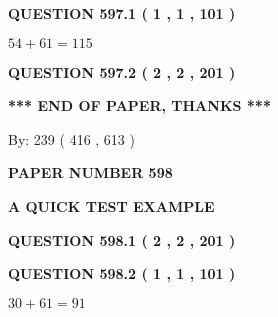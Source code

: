 \documentclass[12pt]{article}
\begin{document}
   
  
\vspace{0.2in}
  
{\textbf{\Large{QUESTION
597.1 
 ( 1 , 1 , 101 )
}}}
  
  
 
 

$ %
54 +  %
61=   %
115$
 
 
  
\vspace{0.2in}
  
{\textbf{\Large{QUESTION
597.2 
 ( 2 , 2 , 201 )
}}}
  
  
   
   
 \vspace{0.2in}
 
   
   
   
   
\vspace{1.0in} 
{\textbf{\large{ *** END OF PAPER, THANKS *** }}} 
   
   
\hspace{1.0in} By: 
 239 ( 416 ,  613 )
   
   
   
   
\newpage 
\setcounter{page}{ 
   598001 } 
   
   
   
   
 {\textbf{ \Large{ PAPER NUMBER  598  }}}
   
   
\vspace{0.2in}
   
   
   
   
   
   
 \vspace{0.2in}
{\LARGE {\textbf{ A QUICK TEST EXAMPLE}}}
   
   
  
\vspace{0.2in}
  
{\textbf{\Large{QUESTION
598.1 
 ( 2 , 2 , 201 )
}}}
  
  
  
\vspace{0.2in}
  
{\textbf{\Large{QUESTION
598.2 
 ( 1 , 1 , 101 )
}}}
  
  
 
 

$ %
30 +  %
61=   %
91$
 
 
   
\end{document}
